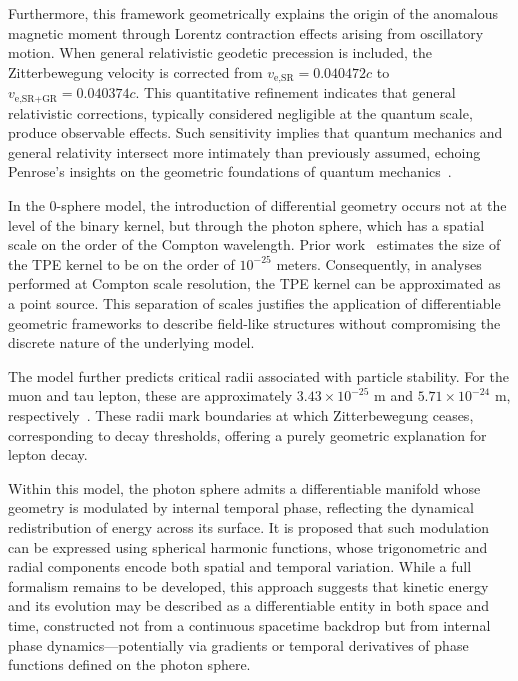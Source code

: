 \documentclass[%
 reprint,
 amsmath,amssymb,
 aps,
]{revtex4-1}
\numberwithin{equation}{section}%
\begin{document}
Furthermore, this framework geometrically explains the origin of the anomalous magnetic moment through Lorentz contraction effects arising from oscillatory motion. When general relativistic geodetic precession is included, the Zitterbewegung velocity is corrected from $v_{\text{e,SR}} = 0.040472c$ to $v_{\text{e,SR+GR}} = 0.040374c$. This quantitative refinement indicates that general relativistic corrections, typically considered negligible at the quantum scale, produce observable effects. Such sensitivity implies that quantum mechanics and general relativity intersect more intimately than previously assumed, echoing Penrose's insights on the geometric foundations of quantum mechanics~\cite{penrose2004}.

In the 0-sphere model, the introduction of differential geometry occurs not at the level of the binary kernel, but through the photon sphere, which has a spatial scale on the order of the Compton wavelength. Prior work~\cite{hanamura2501.0130} estimates the size of the TPE kernel to be on the order of $10^{-25}$ meters. Consequently, in analyses performed at Compton scale resolution, the TPE kernel can be approximated as a point source. This separation of scales justifies the application of differentiable geometric frameworks to describe field-like structures without compromising the discrete nature of the underlying model.

The model further predicts critical radii associated with particle stability. For the muon and tau lepton, these are approximately $3.43 \times 10^{-25}$ m and $5.71 \times 10^{-24}$ m, respectively~\cite{hanamura2501.0130}. These radii mark boundaries at which Zitterbewegung ceases, corresponding to decay thresholds, offering a purely geometric explanation for lepton decay.

Within this model, the photon sphere admits a differentiable manifold whose geometry is modulated by internal temporal phase, reflecting the dynamical redistribution of energy across its surface. It is proposed that such modulation can be expressed using spherical harmonic functions, whose trigonometric and radial components encode both spatial and temporal variation. While a full formalism remains to be developed, this approach suggests that kinetic energy and its evolution may be described as a differentiable entity in both space and time, constructed not from a continuous spacetime backdrop but from internal phase dynamics—potentially via gradients or temporal derivatives of phase functions defined on the photon sphere.
\end{document}
